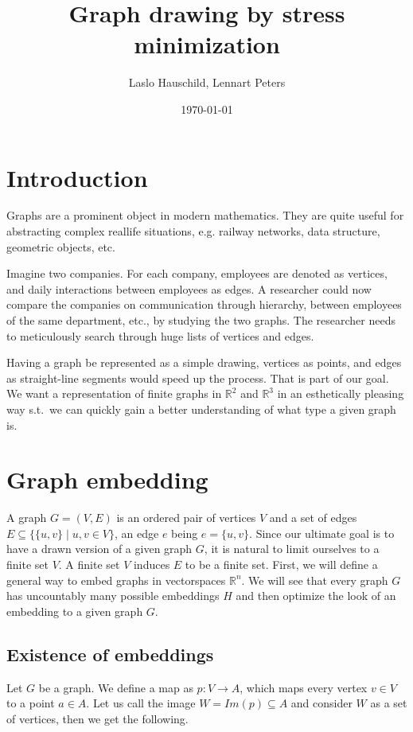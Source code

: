 \documentclass[12pt]{article}
\title{Graph drawing by stress minimization}
\author{Laslo Hauschild, Lennart Peters}
\date{\today}
\begin{document}
\maketitle

\tableofcontents
\newpage

\section{Introduction}

Graphs are a prominent object in modern mathematics.
They are quite useful for abstracting complex reallife situations, e.g.
railway networks, data structure, geometric objects, etc.

Imagine two companies. For each company, employees are denoted as vertices,
and daily interactions between employees as edges.
A researcher could now compare the companies on communication through hierarchy,
between employees of the same department, etc., by studying the two graphs.
The researcher needs to meticulously search through huge lists of vertices and edges.

Having a graph be represented as a simple drawing, vertices as points,
and edges as straight-line segments would speed up the process.
That is part of our goal. We want a representation of finite graphs
in $\mathbb{R}^2$ and $\mathbb{R}^3$ in an esthetically pleasing way
s.t.\ we can quickly gain a better understanding of what type a given graph is.

\section{Graph embedding}
A graph $G=(V,E)$ is an ordered pair of vertices $V$
and a set of edges $E \subseteq \{ \{u,v \} \mid u,v \in V \}$, an edge $e$ being $e=\{u,v\}$.
Since our ultimate goal is to have a drawn version of a given graph $G$,
it is natural to limit ourselves to a finite set $V$.
A finite set $V$ induces $E$ to be a finite set.
First, we will define a general way to embed graphs in vectorspaces $\mathbb{R}^n$.
We will see that every graph $G$ has uncountably many possible embeddings $H$
and then optimize the look of an embedding to a given graph $G$.

\subsection{Existence of embeddings}

Let $G$ be a graph. We define a map as $p : V \to A$, which maps every vertex $v \in V$ to a point $a \in A$.
Let us call the image $W=Im(p) \subseteq A$ and consider $W$ as a set of vertices, then we get the following.
\end{document}
